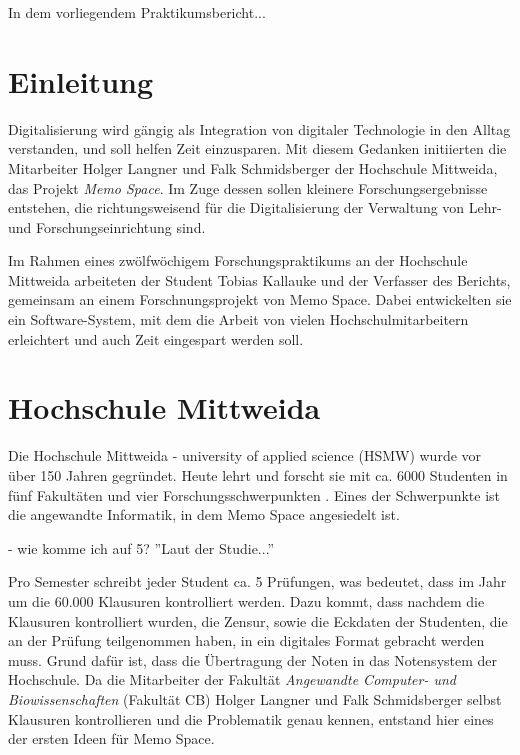 \documentclass[nomenclature, oneside, 150]{HSMW-Thesis}
\begin{document}
\begin{Referat}
In dem vorliegendem Praktikumsbericht...

\end{Referat}


\Hauptteil


\chapter{Einleitung}
	Digitalisierung wird gängig als Integration von digitaler Technologie in den Alltag verstanden, und soll helfen Zeit einzusparen. Mit diesem Gedanken initiierten die Mitarbeiter Holger Langner und Falk Schmidsberger der Hochschule Mittweida, das Projekt \textit{Memo Space}. Im Zuge dessen sollen kleinere Forschungsergebnisse entstehen, die richtungsweisend für die Digitalisierung der Verwaltung von Lehr- und Forschungseinrichtung sind.

	Im Rahmen eines zwölfwöchigem Forschungspraktikums an der Hochschule Mittweida arbeiteten der Student Tobias Kallauke und der Verfasser des Berichts, gemeinsam an einem Forschnungsprojekt von Memo Space. Dabei entwickelten sie ein Software-System, mit dem die Arbeit von vielen Hochschulmitarbeitern erleichtert und auch Zeit eingespart werden soll.


\chapter{Hochschule Mittweida}
	Die Hochschule Mittweida - university of applied science (HSMW)  wurde vor über 150 Jahren gegründet. Heute lehrt und forscht sie mit ca. 6000 Studenten in fünf Fakultäten und vier Forschungsschwerpunkten\cite{noauthor_hochschule_nodate} . Eines der Schwerpunkte ist die angewandte Informatik, in dem Memo Space angesiedelt ist.
	
	- wie komme ich auf 5? ''Laut der Studie...''
	
	Pro Semester schreibt jeder Student ca. 5 Prüfungen, was bedeutet, dass im Jahr um die 60.000 Klausuren kontrolliert werden. Dazu kommt, dass nachdem die Klausuren kontrolliert wurden, die Zensur, sowie die Eckdaten der Studenten, die an der Prüfung teilgenommen haben, in ein digitales Format gebracht werden muss. Grund dafür ist, dass die Übertragung der Noten in das Notensystem der Hochschule. Da die Mitarbeiter der Fakultät \textit{Angewandte Computer- und Biowissenschaften} (Fakultät CB) Holger Langner und Falk Schmidsberger selbst Klausuren kontrollieren und die Problematik genau kennen, entstand hier eines der ersten Ideen für Memo Space.
\end{document}
